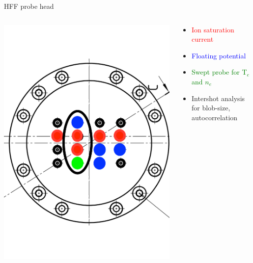 \documentclass[10pt, compress]{beamer}
\begin{document}
\begin{frame}{HFF probe head}
  \begin{columns}
    \begin{column}{0.5\textwidth}
      \includegraphics[width=.9\textwidth, angle=-10]{pdfbox/HeadConfiguration}
    \end{column}
    \begin{column}{0.5\textwidth}
      \begin{itemize}
      \item \textcolor{red}{Ion saturation current}
      \item \textcolor{blue}{Floating potential}
        \item \textcolor{green}{Swept probe for T$_e$ and $n_e$}
        \item Intershot analysis for blob-size, autocorrelation
      \end{itemize}
    \end{column}
  \end{columns}
  
\end{frame}
\end{document}
